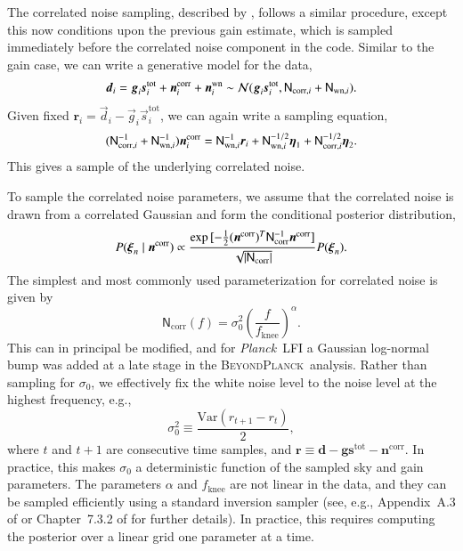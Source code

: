 \documentclass[twocolumn]{../../common/aa}
\def\Planck{\emph{Planck}}
\newcommand{\dv}[0]{\vec{d}}
\newcommand{\n}[0]{\vec{n}}
\newcommand{\s}[0]{\vec{s}}
\newcommand{\g}[0]{\vec{g}}
\newcommand{\N}[0]{\tens{N}}
\newcommand{\bp}{\textsc{BeyondPlanck}}
\begin{document}
The correlated noise sampling, described by \citet{bp06}, follows a similar procedure, except this now conditions upon the previous gain estimate, which is sampled immediately before the correlated noise component in the code. Similar to the gain case, we can write a generative model for the data,
\begin{equation}
	\dv_i=\g_i\s_i^\mathrm{tot}+\n_i^\mathrm{corr}+\n^\mathrm{wn}_i
	\sim\mathcal N(\g_i\s_i^\mathrm{tot},\N_{\mathrm{corr},i}+\N_{\mathrm{wn},i}).
\end{equation}
Given fixed $\boldsymbol r_i=\dv_i-\g_i\s_i^\mathrm{tot}$, we can again write a sampling equation, 
\begin{equation}
	\label{eq:ncorr_gauss_samp}
	(\N_{\mathrm{corr},i}^{-1}+\N_{\mathrm{wn},i}^{-1})
	\n^\mathrm{corr}_i
	=\N^{-1}_{\mathrm{wn},i}\boldsymbol r_i
	+\N^{-1/2}_{\mathrm{wn},i}\boldsymbol\eta_1
	+\N^{-1/2}_{\mathrm{corr},i}\boldsymbol\eta_2.
\end{equation}
This gives a sample of the underlying correlated noise. %

To sample the correlated noise parameters, we assume that the correlated noise is drawn from a correlated Gaussian and form the conditional posterior distribution,
\begin{equation}
	P(\boldsymbol\xi_n\mid\n^\mathrm{corr})\propto\frac{\exp{[-\frac12(\n^\mathrm{corr})^T\N_\mathrm{corr}^{-1}\n^\mathrm{corr}]}}
	{\sqrt{|\N_\mathrm{corr}|}}P(\boldsymbol\xi_n).
\end{equation}
The simplest and most commonly used parameterization for correlated noise is given by
\begin{equation}
	\mathsf N_\mathrm{corr}(f)=\sigma_0^2\left(\frac f{f_\mathrm{knee}}\right)^\alpha.
\end{equation}
This can in principal be modified, and for \Planck\ LFI a Gaussian log-normal bump was added at a late stage in the \bp\ analysis. Rather than sampling for $\sigma_0$, we effectively fix the white noise level to the noise level at the highest frequency, e.g.,
\begin{equation}
	\sigma_0^2\equiv\frac{\mathrm{Var}(r_{t+1}-r_t)}2,
\end{equation}
where $t$ and $t+1$ are consecutive time samples, and ${\boldsymbol r\equiv\boldsymbol d-\boldsymbol g\boldsymbol s^\mathrm{tot}
-\boldsymbol n^\mathrm{corr}}$. In practice, this makes $\sigma_0$ a deterministic function of the sampled sky and gain parameters. The parameters $\alpha$ and $f_\mathrm{knee}$ are not linear in the data, and they can be sampled efficiently using a standard inversion sampler (see, e.g., Appendix~A.3 of \citet{bp01} or Chapter~7.3.2 of \citet{numerical_recipes} for further details). In practice, this requires computing the posterior over a linear grid one parameter at a time.
\end{document}
